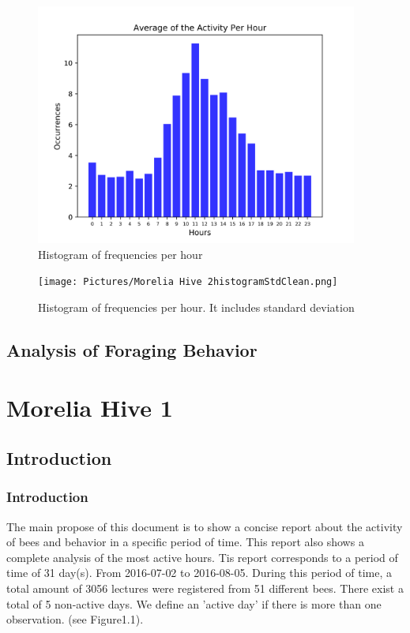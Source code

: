 \documentclass[11pt,fleqn]{book} %
\begin{document}
\begin{figure}[h!]%
\centering%
\includegraphics[width=400px]{Pictures/Morelia Hive 2histogramClean.png}%
\caption{Histogram of frequencies per hour}%
\end{figure}

%


\begin{figure}[h!]%
\centering%
\texttt{[image: Pictures/Morelia Hive 2histogramStdClean.png]}%
\caption{Histogram of frequencies per hour. It includes standard deviation}%
\end{figure}

\chapter{Analysis of Foraging Behavior}
\part{Morelia Hive 1}
\chapter{Introduction} 
\normalsize%
\section{Introduction}%
\label{sec:Introduction}%
The main propose of this document  is to show a concise report about the activity of bees and behavior in a specific period of time. This report also shows a complete analysis of the most active hours.\newline%
\newline%
Tis report corresponds to a period of time of 31 day(s). From 2016{-}07{-}02 to 2016{-}08{-}05. During this period of time, a total amount of 3056 lectures were registered from 51 different bees. There exist a total of 5 non{-}active days. We define an 'active day' if there is more than one observation. (see Figure1.1).\newline%
\newline%
\end{document}
